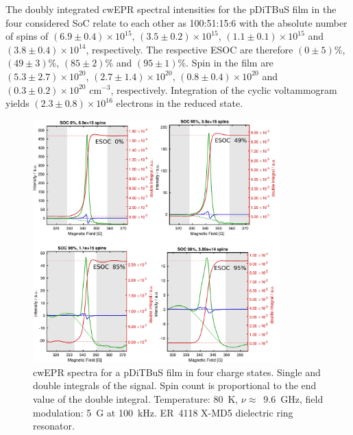 The doubly integrated cwEPR spectral intensities for the pDiTBuS film in the four considered SoC relate to each other as 100:51:15:6 with the absolute number of spins of $(6.9\pm0.4)\times10^{15}$, $(3.5\pm0.2)\times10^{15}$, $(1.1\pm0.1)\times10^{15}$ and $(3.8\pm0.4)\times10^{14}$, respectively. The respective ESOC are therefore $(0\pm5)$\%, $(49\pm3)$\%, $(85\pm2)$\% and $(95\pm1)$\%. Spin  in the film are $(5.3\pm2.7)\times10^{20}$, $(2.7\pm1.4)\times10^{20}$, $(0.8\pm0.4)\times10^{20}$ and $(0.3\pm0.2)\times10^{20}$ cm$^{-3}$, respectively. Integration of the cyclic voltammogram yields $(2.3\pm0.8)\times10^{16}$ electrons in the reduced state.\\
\begin{figure}[h]
\center
	\includegraphics[width=0.85\textwidth]{./pulse/figures/Figure_S6}
	\caption{cwEPR spectra for a pDiTBuS film in four charge states. Single and double integrals of the signal. Spin count is proportional to the end value of the double integral. Temperature: 80~K, $\nu\approx$~9.6~GHz, field modulation: 5~G at 100~kHz. ER~4118 X-MD5 dielectric ring resonator.}
	\label{fig:Figure_S6}
\end{figure}


